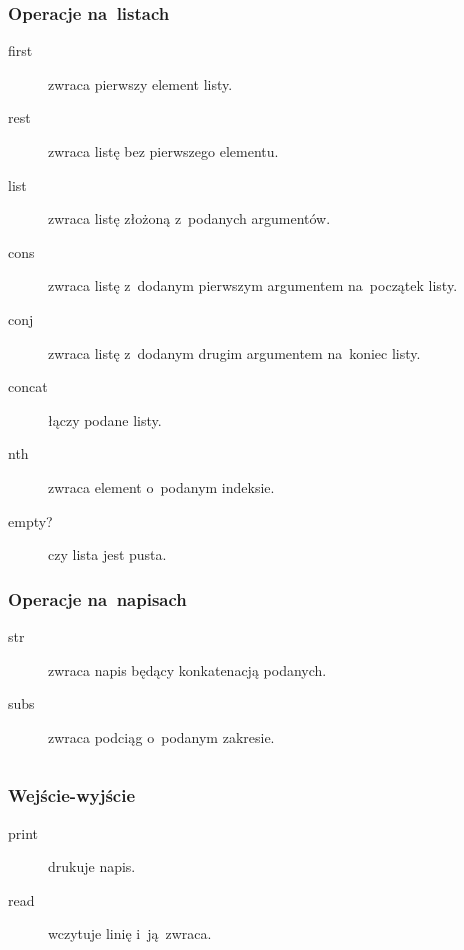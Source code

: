 \documentclass[a4paper,11pt]{article}
\newcommand{\clj}[1]{\inputminted[fontsize=\footnotesize]{clojure}{code/#1.clj}}
\begin{document}
\subsubsection{Operacje na~listach}

\begin{description}
\item[first] zwraca pierwszy element listy.

\item[rest] zwraca listę bez pierwszego elementu.

\item[list] zwraca listę złożoną z~podanych argumentów.

\item[cons] zwraca listę z~dodanym pierwszym argumentem na~początek listy.

\item[conj] zwraca listę z~dodanym drugim argumentem na~koniec listy.

\item[concat] łączy podane listy.

\item[nth] zwraca element o~podanym indeksie.

\item[empty?] czy lista jest pusta.

\end{description}

\subsubsection{Operacje na~napisach}

\begin{description}
\item[str] zwraca napis będący konkatenacją podanych.

\item[subs] zwraca podciąg o~podanym zakresie.
  \clj{subs}
\end{description}

\subsubsection{Wejście-wyjście}

\begin{description}
\item[print] drukuje napis.
\item[read] wczytuje linię i~ją~zwraca.
\end{description}
\end{document}

